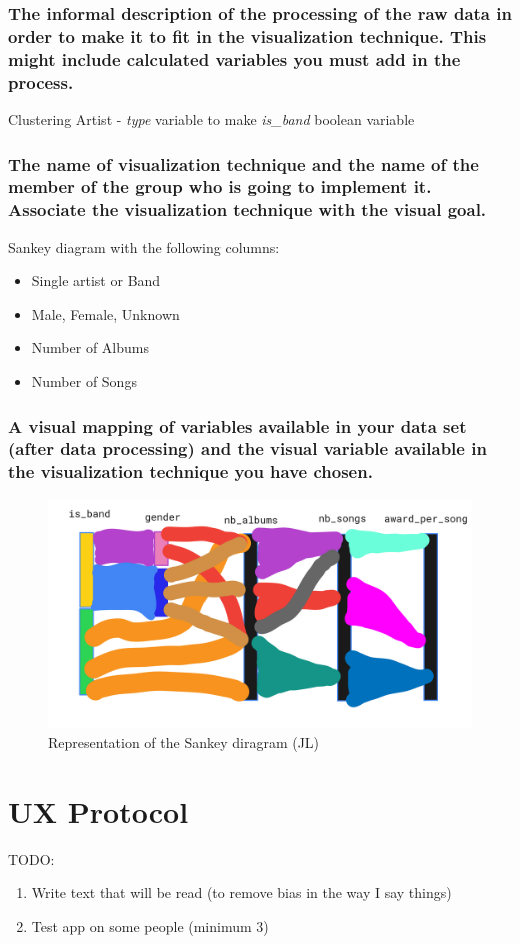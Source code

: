 \documentclass{article}
\begin{document}
\subsubsection*{The informal description of the processing of the raw data in order to make it to fit in the visualization technique. This might include calculated variables you must add in the process.}
Clustering Artist - \textit{type} variable to make \textit{is\_band} boolean variable


\subsubsection*{The name of visualization technique and the name of the member of the group who is going to implement it. Associate the visualization technique with the visual goal.}
Sankey diagram with the following columns:
\begin{itemize}
    \item Single artist or Band
    \item Male, Female, Unknown
    \item Number of Albums
    \item Number of Songs
\end{itemize}

\subsubsection*{A visual mapping of variables available in your data set (after data processing) and the visual variable available in the visualization technique you have chosen.}

\begin{figure}[H]
    \centering
    \includegraphics[width=.8\textwidth]{Images/sketch_jl.png}
    \caption{Representation of the Sankey diragram (JL)}
\end{figure}

\section{UX Protocol}
TODO:
\begin{enumerate}
    \item Write text that will be read (to remove bias in the way I say things)
    \item Test app on some people (minimum 3)
\end{enumerate}
\end{document}
